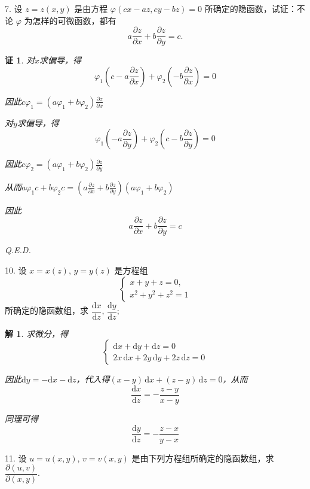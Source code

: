 \documentclass[a4paper,12pt]{article}
\newtheorem*{pf}{证}
\newtheorem*{sol}{解}
\begin{document}
7. 设 $z = z(x,y)$ 是由方程 $\varphi(cx - az, cy - bz) = 0$ 所确定的隐函数，试证：不论 $\varphi$ 为怎样的可微函数，都有
$$
    a\frac{\partial z}{\partial x} + b\frac{\partial z}{\partial y} = c.
$$
\begin{pf}
    对$x$求偏导，得
    $$\varphi_1\left(c - a\frac{\partial z}{\partial x}\right) + \varphi_2\left(-b\frac{\partial z}{\partial x}\right) = 0$$

    因此$c\varphi_1 = (a\varphi_1 + b\varphi_2)\frac{\partial z}{\partial x}$

    对$y$求偏导，得
    $$\varphi_1\left(-a\frac{\partial z}{\partial y}\right) + \varphi_2\left(c - b\frac{\partial z}{\partial y}\right) = 0$$

    因此$c\varphi_2 = (a\varphi_1 + b\varphi_2)\frac{\partial z}{\partial y}$

    从而$a\varphi_1 c + b\varphi_2 c = \left(a\frac{\partial z}{\partial x} + b\frac{\partial z}{\partial y}\right)(a\varphi_1 + b\varphi_2)$

    因此
    $$a\frac{\partial z}{\partial x} + b\frac{\partial z}{\partial y} = c$$

    Q.E.D.
\end{pf}


10. 设 $x = x(z)$, $y = y(z)$ 是方程组
$$
    \begin{cases}
        x + y + z = 0, \\
        x^2 + y^2 + z^2 = 1
    \end{cases}
$$
所确定的隐函数组，求 $\dfrac{\mathrm{d}x}{\mathrm{d}z}$, $\dfrac{\mathrm{d}y}{\mathrm{d}z}$;
\begin{sol}
    求微分，得
    $$\begin{cases}
            \mathrm{d}x + \mathrm{d}y + \mathrm{d}z = 0 \\
            2x\,\mathrm{d}x + 2y\,\mathrm{d}y + 2z\,\mathrm{d}z = 0
        \end{cases}$$

    因此$\mathrm{d}y = -\mathrm{d}x - \mathrm{d}z$，代入得$(x - y)\,\mathrm{d}x + (z - y)\,\mathrm{d}z = 0$，从而
    $$\frac{\mathrm{d}x}{\mathrm{d}z} = -\frac{z - y}{x - y}$$

    同理可得
    $$\frac{\mathrm{d}y}{\mathrm{d}z} = -\frac{z - x}{y - x}$$
\end{sol}


11. 设 $u = u(x,y)$, $v = v(x,y)$ 是由下列方程组所确定的隐函数组，求 $\dfrac{\partial(u,v)}{\partial(x,y)}$.
\end{document}
